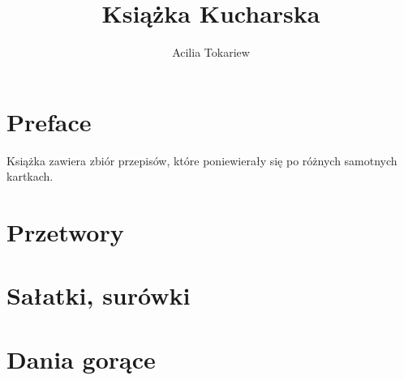 \documentclass[14pt,twoside,parskip=half*]{scrbook}
\title{Książka Kucharska}
\author{Acilia Tokariew}
\begin{document}
\frontmatter{}
\maketitle{}
\tableofcontents{}
\chapter{Preface}
Książka zawiera zbiór przepisów, które poniewierały się po różnych samotnych
kartkach.

\mainmatter{}

\chapter{Przetwory}

\label{ch:przetwory}

\chapter{Sałatki, surówki}

\label{ch:salatki-surowki}

\chapter{Dania gorące}

\label{ch:dania-gorace}
\end{document}
